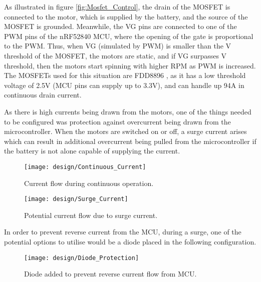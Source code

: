 As illustrated in figure \ref{fig:Mosfet_Control}, the drain of the MOSFET is connected to the motor, which is supplied by 
the battery, and the source of the MOSFET is grounded. Meanwhile, the VG pins are connected to one of the PWM pins 
of the nRF52840 MCU, where the opening of the gate is proportional to the PWM. Thus, when VG (simulated by PWM) is 
smaller than the V threshold of the MOSFET, the motors are static, and if VG surpasses V threshold, then the motors 
start spinning with higher RPM as PWM is increased. 
The MOSFETs used for this situation are FDD8896 \cite{FDD8896}, as it has 
a low threshold voltage of 2.5V (MCU pins can supply 
up to 3.3V), and can handle up 94A in continuous drain 
current.

As there is high currents being drawn from the motors, one of the things needed to be configured was protection 
against overcurrent being drawn from the microcontroller. When the motors are switched on or off, 
a surge current arises which can result in additional overcurrent being pulled from the microcontroller if 
the battery is not alone capable of supplying the current. 

\begin{figure}[H]
    \begin{center}
    \texttt{[image: design/Continuous\_Current]}
    \end{center}
    \caption{Current flow during continuous operation.}
    \label{fig:Continuous_Current}
\end{figure}

\begin{figure}[H]
    \begin{center}
    \texttt{[image: design/Surge\_Current]}
    \end{center}
    \caption{Potential current flow due to surge current.}
    \label{fig:Surge_Current}
\end{figure}

In order to prevent reverse current from the MCU, 
during a surge, one of the potential options to utilise would be a diode placed in the following 
configuration. 

\begin{figure}[H]
    \begin{center}
    \texttt{[image: design/Diode\_Protection]}
    \end{center}
    \caption{Diode added to prevent reverse current flow from MCU.}
    \label{fig:Diode_Protection}
\end{figure}

